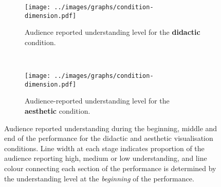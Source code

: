 \begin{figure}
\centering
\begin{subfigure}{\textwidth}
  \centering
  \texttt{[image: ../images/graphs/condition-dimension.pdf]}
  \caption[Didactic condition understanding detailed survey results]{Audience reported understanding level for the \textbf{didactic} condition.}
  \label{fig:didactic-understanding}
\end{subfigure}\\
\vspace{15mm}
\begin{subfigure}{\textwidth}
  \centering
  \texttt{[image: ../images/graphs/condition-dimension.pdf]}
  \caption[Aesthetic condition understanding detailed survey results]{Audience-reported understanding level for the \textbf{aesthetic} condition.}
  \label{fig:aesthetic-understanding}
\end{subfigure}
\vspace{15mm}
\caption[User study understanding survey responses]{Audience reported understanding during the beginning, middle and end of the performance for the didactic and aesthetic visualisation conditions. Line width at each stage indicates proportion of the audience reporting high, medium or low understanding, and line colour connecting each section of the performance is determined by the understanding level at the \emph{beginning} of the performance.}
\label{fig:user-study-condition-understanding}
\end{figure}
